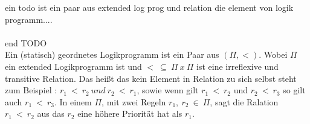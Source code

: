 ein todo ist ein paar aus extended log prog und relation die element von logik programm....\\
\\
end TODO\\




Ein (statisch) geordnetes Logikprogramm ist ein Paar aus $(\Pi,<)$. Wobei $\Pi$ ein extended Logikprogramm ist und $<~\subseteq~\Pi~x~\Pi$ ist eine irreflexive und transitive Relation. Das heißt das kein Element in Relation zu sich selbst steht zum Beispiel : $r_1~<~r_2~ und~r_2~<~r_1$, sowie wenn gilt $r_1~<~r_2$ und $r_2~<~r_3$ so gilt auch $r_1~<~r_3$. In einem $\Pi$, mit zwei Regeln $r_1,~r_2~\in~\Pi$, sagt die Ralation $r_1~<~r_2$ aus das $r_2$ eine höhere Priorität hat als $r_1$.
